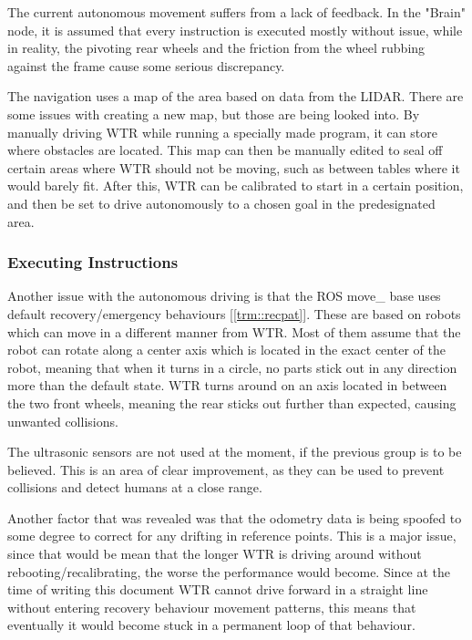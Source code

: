 The current autonomous movement suffers from a lack of feedback.
In the "Brain" node, it is assumed that every instruction is executed mostly without issue, while in reality, the pivoting rear wheels and the friction from the wheel rubbing against the frame cause some serious discrepancy.

The navigation uses a map of the area based on data from the LIDAR.
There are some issues with creating a new map, but those are being looked into.
By manually driving WTR while running a specially made program, it can store where obstacles are located.
This map can then be manually edited to seal off certain areas where WTR should not be moving, such as between tables where it would barely fit.
After this, WTR can be calibrated to start in a certain position, and then be set to drive autonomously to a chosen goal in the predesignated area.

\subsubsection{Executing Instructions}
Another issue with the autonomous driving is that the ROS move\_ base uses default recovery/emergency behaviours [\ref{trm::recpat}].
These are based on robots which can move in a different manner from WTR.
Most of them assume that the robot can rotate along a center axis which is located in the exact center of the robot, meaning that when it turns in a circle, no parts stick out in any direction more than the default state.
WTR turns around on an axis located in between the two front wheels, meaning the rear sticks out further than expected, causing unwanted collisions.

The ultrasonic sensors are not used at the moment, if the previous group is to be believed.
This is an area of clear improvement, as they can be used to prevent collisions and detect humans at a close range.

Another factor that was revealed was that the odometry data is being spoofed to some degree to correct for any drifting in reference points.
This is a major issue, since that would be mean that the longer WTR is driving around without rebooting/recalibrating, the worse the performance would become.
Since at the time of writing this document WTR cannot drive forward in a straight line without entering recovery behaviour movement patterns, this means that eventually it would become stuck in a permanent loop of that behaviour.

\newpage
